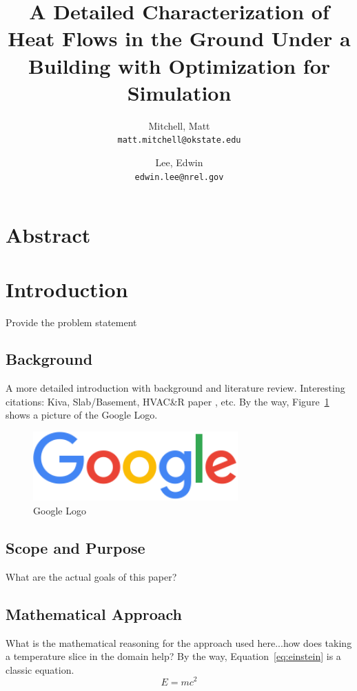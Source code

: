 \documentclass{article}
\title{A Detailed Characterization of Heat Flows in the Ground Under a Building with Optimization for Simulation}
\author{
  Mitchell, Matt\\
  \texttt{matt.mitchell@okstate.edu}
  \and
  Lee, Edwin\\
  \texttt{edwin.lee@nrel.gov}
}
\date{}
\begin{document}
 
 \maketitle
 
 \section*{Abstract}
 
 \section*{Introduction}
     Provide the problem statement

  \subsection*{Background}
   A more detailed introduction with background and literature review.  Interesting citations: Kiva, Slab/Basement, HVAC\&R paper \citep{Lee2013}, etc.  By the way, Figure~\ref{fig:google} shows a picture of the Google Logo.
   \begin{figure}
    \centering
    \label{fig:google}
    \includegraphics[width=0.7\textwidth]{images/googlelogo.png}
    \caption{Google Logo}
   \end{figure}

  \subsection*{Scope and Purpose}
   What are the actual goals of this paper?

  \subsection*{Mathematical Approach}
   What is the mathematical reasoning for the approach used here...how does taking a temperature slice in the domain help?  By the way, Equation~\eqref{eq:einstein} is a classic equation.
   \begin{equation}
    \label{eq:einstein}
    E = m c^2
   \end{equation}
 
\end{document}
